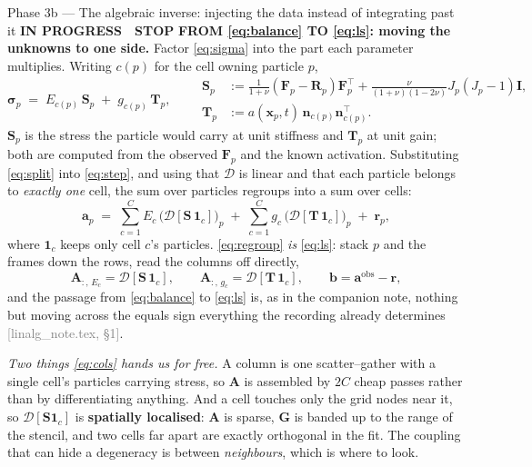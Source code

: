 \documentclass[11pt,a4paper]{article}
\newcommand{\Mat}[1]{\mathbf{#1}}
\newcommand{\A}{\Mat{A}}
\newcommand{\src}[1]{{\footnotesize\textcolor{grey}{[#1]}}}
\newcommand{\prog}{\textcolor{warn}{\textbf{IN PROGRESS}}}
\newcommand{\stopp}{\textcolor{bad!30!white}{\textbf{STOP}}}
\begin{document}
\begin{phasebox}{Phase 3b --- The algebraic inverse: injecting the data instead of integrating past it \hfill \prog\ \ \stopp}
\medskip
\textbf{FROM \eqref{eq:balance} TO \eqref{eq:ls}: moving the unknowns to one side.} Factor
\eqref{eq:sigma} into the part each parameter multiplies. Writing $c(p)$ for the cell owning
particle $p$,
\begin{equation}
\boldsymbol\sigma_p \;=\; E_{c(p)}\,\Mat S_p \;+\; g_{c(p)}\,\Mat T_p ,
\qquad
\begin{aligned}
\Mat S_p &:= \tfrac{1}{1+\nu}(\Mat F_p-\Mat R_p)\Mat F_p^{\!\top}
 + \tfrac{\nu}{(1+\nu)(1-2\nu)}J_p(J_p-1)\Mat I ,\\
\Mat T_p &:= a(\Mat x_p,t)\,\Mat n_{c(p)}\Mat n_{c(p)}^{\!\top} .
\end{aligned}
\label{eq:split}
\end{equation}
$\Mat S_p$ is the stress the particle would carry at unit stiffness and $\Mat T_p$ at unit gain;
both are computed from the observed $\Mat F_p$ and the known activation. Substituting
\eqref{eq:split} into \eqref{eq:step}, and using that $\mathcal D$ is linear and that each particle
belongs to \emph{exactly one} cell, the sum over particles regroups into a sum over cells:
\begin{equation}
\Mat a_p \;=\; \sum_{c=1}^{C} E_c\,\big(\mathcal D[\Mat S\,\mathbf 1_c]\big)_p
\;+\; \sum_{c=1}^{C} g_c\,\big(\mathcal D[\Mat T\,\mathbf 1_c]\big)_p \;+\; \Mat r_p ,
\label{eq:regroup}
\end{equation}
where $\mathbf 1_c$ keeps only cell $c$'s particles. \eqref{eq:regroup} \emph{is}
\eqref{eq:ls}: stack $p$ and the frames down the rows, read the columns off directly,
\begin{equation}
\A_{:,\,E_c} = \mathcal D[\Mat S\,\mathbf 1_c], \qquad
\A_{:,\,g_c} = \mathcal D[\Mat T\,\mathbf 1_c], \qquad
\Mat b = \Mat a^{\text{obs}} - \Mat r ,
\label{eq:cols}
\end{equation}
and the passage from \eqref{eq:balance} to \eqref{eq:ls} is, as in the companion note, nothing but
moving across the equals sign everything the recording already determines \src{linalg\_note.tex,
\S1}.

\emph{Two things \eqref{eq:cols} hands us for free.} A column is one scatter--gather with a single
cell's particles carrying stress, so $\A$ is assembled by $2C$ cheap passes rather than by
differentiating anything. And a cell touches only the grid nodes near it, so
$\mathcal D[\Mat S\mathbf 1_c]$ is \textbf{spatially localised}: $\A$ is sparse, $\Mat G$ is banded
up to the range of the stencil, and two cells far apart are exactly orthogonal in the fit. The
coupling that can hide a degeneracy is between \emph{neighbours}, which is where to look.


\end{phasebox}
\end{document}
